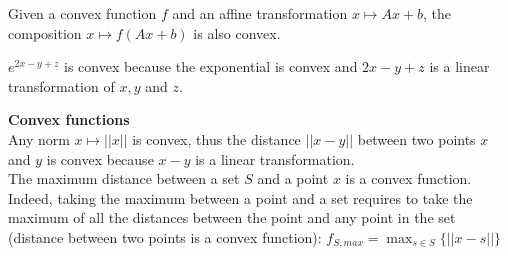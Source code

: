%
\vspace{0.5cm}
\begin{property}
 Given a convex function $f$ and an affine transformation $ x \mapsto Ax + b $, the composition $x \mapsto f(Ax + b)$ is also convex.
 \end{property}
 \begin{example}
\begin{leftbar}
	$e^{2x - y + z}$ is convex because the exponential is convex and  $2x - y + z$ is a linear transformation of $x, y$ and $z$.
	\end{leftbar}
	\end{example}
	
  \begin{example}
\begin{leftbar}	
	\textbf{Convex functions}\\
	Any norm $x \mapsto ||x ||$ is convex, thus the distance $||x-y||$ between two points $x$ and $y$ is convex because $x-y$ is a linear transformation.\\
    The maximum distance between a set $S$ and a point $x$ is a convex function. Indeed, taking the maximum between a point and a set requires to take the maximum of all the distances between the point and any point in the set (distance between two points is a convex function): $f_{S,max} = \max_{s \in S}\{ ||x - s|| \}$ 
	\end{leftbar}
	\end{example}
    

